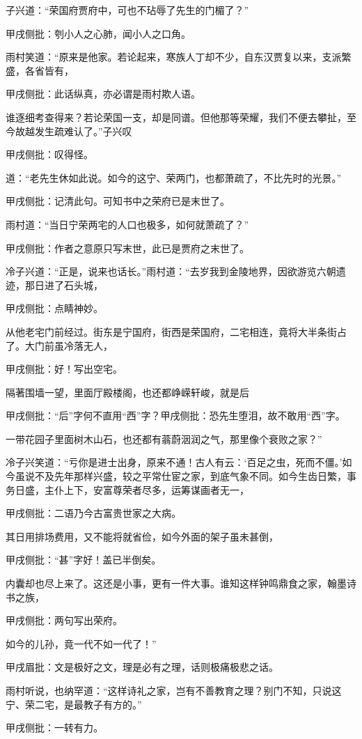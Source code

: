 \begin{parag}
    子兴道：“荣国府贾府中，可也不玷辱了先生的门楣了？”\begin{note}甲戌侧批：刳小人之心肺，闻小人之口角。\end{note}雨村笑道：“原来是他家。若论起来，寒族人丁却不少，自东汉贾复以来，支派繁盛，各省皆有，\begin{note}甲戌侧批：此话纵真，亦必谓是雨村欺人语。\end{note}谁逐细考查得来？若论荣国一支，却是同谱。但他那等荣耀，我们不便去攀扯，至今故越发生疏难认了。”子兴叹\begin{note}甲戌侧批：叹得怪。\end{note}道：“老先生休如此说。如今的这宁、荣两门，也都萧疏了，不比先时的光景。”\begin{note}甲戌侧批：记清此句。可知书中之荣府已是末世了。\end{note}雨村道：“当日宁荣两宅的人口也极多，如何就萧疏了？”\begin{note}甲戌侧批：作者之意原只写末世，此已是贾府之末世了。\end{note}冷子兴道：“正是，说来也话长。”雨村道：“去岁我到金陵地界，因欲游览六朝遗迹，那日进了石头城，\begin{note}甲戌侧批：点睛神妙。\end{note}从他老宅门前经过。街东是宁国府，街西是荣国府，二宅相连，竟将大半条街占了。大门前虽冷落无人，\begin{note}甲戌侧批：好！写出空宅。\end{note}隔著围墙一望，里面厅殿楼阁，也还都峥嵘轩峻，就是后\begin{note}甲戌侧批：“后”字何不直用“西”字？甲戌侧批：恐先生堕泪，故不敢用“西”字。\end{note}一带花园子里面树木山石，也还都有蓊蔚洇润之气，那里像个衰败之家？”
\end{parag}


\begin{parag}
    冷子兴笑道：“亏你是进士出身，原来不通！古人有云：‘百足之虫，死而不僵。’如今虽说不及先年那样兴盛，较之平常仕宦之家，到底气象不同。如今生齿日繁，事务日盛，主仆上下，安富尊荣者尽多，运筹谋画者无一，\begin{note}甲戌侧批：二语乃今古富贵世家之大病。\end{note}其日用排场费用，又不能将就省俭，如今外面的架子虽未甚倒，\begin{note}甲戌侧批：“甚”字好！盖已半倒矣。\end{note}内囊却也尽上来了。这还是小事，更有一件大事。谁知这样钟鸣鼎食之家，翰墨诗书之族，\begin{note}甲戌侧批：两句写出荣府。\end{note}如今的儿孙，竟一代不如一代了！”\begin{note}甲戌眉批：文是极好之文，理是必有之理，话则极痛极悲之话。\end{note}雨村听说，也纳罕道：“这样诗礼之家，岂有不善教育之理？别门不知，只说这宁、荣二宅，是最教子有方的。”\begin{note}甲戌侧批：一转有力。\end{note}
\end{parag}


